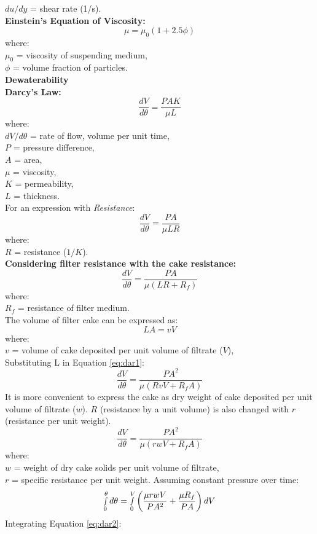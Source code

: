 \documentclass[a4paper, landscape, 8pt]{extarticle}
\begin{document}
\begin{multicols}{4}
$du/dy$ = shear rate (1/s).\\
\textbf{Einstein's Equation of Viscosity:}
\[
\mu = \mu_0 (1+2.5\phi)
\]
where:\\
$\mu_0$ = viscosity of suspending medium,\\
$\phi$ = volume fraction of particles.\\
\textbf{Dewaterability}\\
\textbf{Darcy's Law:}
\[
\frac{dV}{d\theta} = \frac{PAK}{\mu L}
\]
where:\\
$dV/d\theta$ = rate of flow, volume per unit time,\\
$P$ = pressure difference,\\
$A$ = area,\\
$\mu$ = viscosity,\\
$K$ = permeability,\\
$L$ = thickness.\\
For an expression with \textsl{Resistance}:
\[
\frac{dV}{d\theta} = \frac{PA}{\mu LR}
\]
where:\\
$R$ = resistance ($1/K$).\\
\textbf{Considering filter resistance with the cake resistance:}
\begin{equation}
    \frac{dV}{d\theta} = \frac{PA}{\mu (LR+R_f)}
\label{eq:dar1}
\end{equation}
where:\\
$R_f$ = resistance of filter medium.\\
The volume of filter cake can be expressed as:
\[
LA = vV
\]
where:\\
$v$ = volume of cake deposited per unit volume of filtrate ($V$),\\
Substituting L in Equation \ref{eq:dar1}:
\[
\frac{dV}{d\theta} = \frac{PA^2}{\mu (RvV+R_fA)}
\]
It is more convenient to express the cake as dry weight of cake deposited per unit volume of filtrate ($w$). $R$ (resistance by a unit volume) is also changed with $r$ (resistance per unit weight).
\[
\frac{dV}{d\theta} = \frac{PA^2}{\mu (rwV+R_fA)}
\]
where:\\
$w$ = weight of dry cake solids per unit volume of filtrate,\\
$r$ = specific resistance per unit weight.
Assuming constant pressure over time:
\begin{equation}
    \smallint_{0}^{\theta} d\theta = \smallint_{0}^{V} \left( \frac{\mu rwV}{PA^2}+\frac{\mu R_f}{PA}\right)dV \label{eq:dar2}
\end{equation}
Integrating Equation \ref{eq:dar2}:
\begin{equation}

\end{equation}
\end{multicols}
\end{document}
